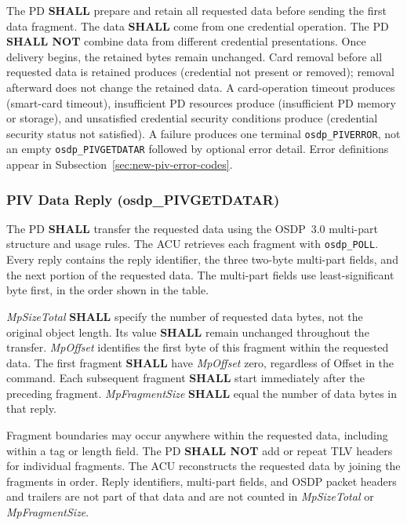 The PD \textbf{SHALL} prepare and retain all requested data before sending the
first data fragment. The data \textbf{SHALL} come from one credential operation.
The PD \textbf{SHALL NOT} combine data from different credential presentations.
Once delivery begins, the retained bytes remain unchanged.
Card removal before all requested data is retained produces 
(credential not present or removed);
removal afterward does not change the retained data. A card-operation timeout produces
 (smart-card timeout), insufficient PD resources produce
 (insufficient PD memory or storage), and
unsatisfied credential security conditions produce 
(credential security status not satisfied).
A failure produces one terminal \texttt{osdp\_PIVERROR}, not an empty
\texttt{osdp\_PIVGETDATAR} followed by optional error detail.
Error definitions appear in Subsection~\ref{sec:new-piv-error-codes}.

\subsubsection{PIV Data Reply (osdp\_PIVGETDATAR)}\label{sec:pivdatar}



The PD \textbf{SHALL} transfer the requested data using the OSDP~3.0 multi-part
structure and usage rules. The ACU retrieves each fragment with \texttt{osdp\_POLL}.
Every reply contains the reply identifier, the three two-byte multi-part fields,
and the next portion of the requested data. The multi-part fields use
least-significant byte first, in the order shown in the table.

\emph{MpSizeTotal} \textbf{SHALL} specify the number of requested data bytes,
not the original object length. Its value \textbf{SHALL} remain unchanged
throughout the transfer. \emph{MpOffset} identifies the first byte of this
fragment within the requested data. The first fragment \textbf{SHALL} have
\emph{MpOffset} zero, regardless of Offset in the command. Each subsequent
fragment \textbf{SHALL} start immediately after the preceding fragment.
\emph{MpFragmentSize} \textbf{SHALL} equal the number of data bytes in that reply.

Fragment boundaries may occur anywhere within the requested data, including
within a tag or length field. The PD \textbf{SHALL NOT} add or repeat TLV headers
for individual fragments. The ACU reconstructs the requested data by joining
the fragments in order. Reply identifiers, multi-part fields, and OSDP packet
headers and trailers are not part of that data and are not counted in
\emph{MpSizeTotal} or \emph{MpFragmentSize}.

